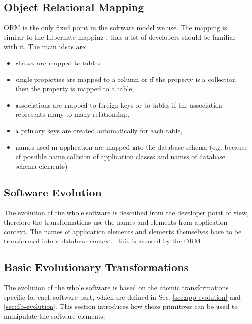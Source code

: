 \documentclass[runningheads]{comsis}
\begin{document}
\subsection{Object Relational Mapping}
ORM is the only fixed point in the software model we use. The mapping is similar to the Hibernate mapping \cite{Hibernate}, thus a lot of developers should be familiar with it. The main ideas are: 
\begin{itemize}
	\item classes are mapped to tables,
	\item single properties are mapped to a column or if the property is a collection then the property is mapped to a table,
	\item associations are mapped to foreign keys or to tables if the association represents many-to-many  relationship,
	\item a primary keys are created automatically for each table,
	\item names used in application are mapped into the database schema (e.g. because of possible name collision of application classes and names of database schema elements) 
\end{itemize}

\subsection{Software Evolution}
\label{sec:sw-evolution}
The evolution of the whole software is described from the developer point of view, therefore the transformations use the names and elements from application context. The names of application elements and elements themselves have to be transformed into a database context - this is assured by the ORM.

\subsection{Basic Evolutionary Transformations}
\label{sec:sw-basic-evolution}
The evolution of the whole software is based on the atomic transformations specific for each software part, which are defined in Sec. \ref{sec:app-evolution} and \ref{sec:db-evolution}. This section introduces how those primitives can be used to manipulate the software elements.
\end{document}
